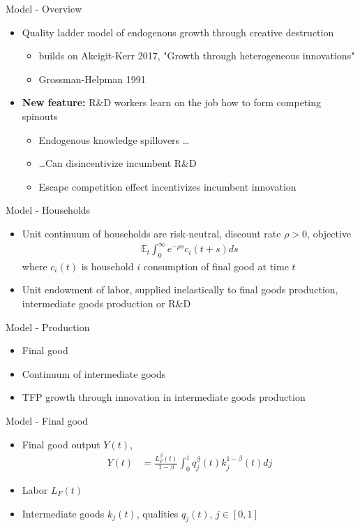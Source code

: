 \documentclass[english,usenames,dvipsnames]{beamer}
\begin{document}
\begin{frame}{Model - Overview}
\begin{itemize}	
	\item Quality ladder model of endogenous growth through creative destruction 
	\begin{itemize}
		\item builds on Akcigit-Kerr 2017, "Growth through heterogeneous innovations"
		\item Grossman-Helpman 1991
	\end{itemize}
	\item \textbf{New feature:} R\&D workers \alert{learn on the job} how to form \alert{competing spinouts}
	\begin{itemize}
		\item \alert{Endogenous knowledge spillovers} \ldots
		\item \ldots Can \alert{disincentivize incumbent R\&D}
		\item \alert{Escape competition effect} incentivizes incumbent innovation 
	\end{itemize} 
\end{itemize}
\end{frame}

\begin{frame}{Model - Households}
\begin{itemize}
	\item Unit continuum of households are risk-neutral, discount rate $\rho > 0$, objective
	\begin{align*}
	\mathbb{E}_t \int_0^{\infty} e^{-\rho s} c_i(t+s) ds
	\end{align*}
	where $c_i(t)$ is household $i$ consumption of final good at time $t$
	\item Unit endowment of labor, supplied inelastically to final goods production, intermediate goods production or R\&D
\end{itemize}
\end{frame}

\begin{frame}{Model - Production}
\begin{itemize}
	\item Final good
	\item Continuum of intermediate goods
	\item TFP growth through innovation in intermediate goods production
\end{itemize}
\end{frame}

\begin{frame}{Model - Final good}
\begin{itemize}
	\item Final good output $Y(t)$,
	\begin{align*}
	Y(t) &= \frac{L_F^{\beta}(t)}{1-\beta} \int_0^1 q_j^{\beta}(t) k_j^{1-\beta} (t) dj 
	\end{align*}
	\item Labor $L_F(t)$
	\item Intermediate goods $k_j(t)$, qualities $q_j(t)$, $j \in [0,1]$
\end{itemize}
\end{frame}
\end{document}
